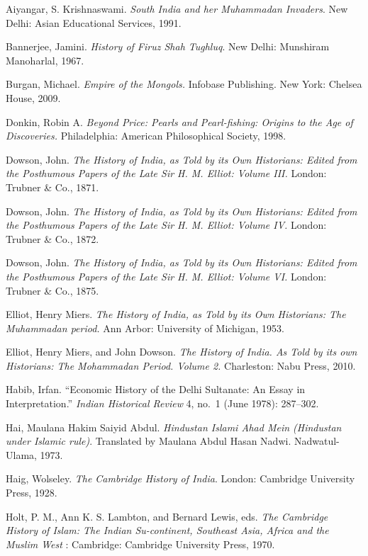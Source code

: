 \begin{thebibliography}{99}
 Aiyangar, S. Krishnaswami.  \textit{South India and her Muhammadan Invaders}. New Delhi: Asian Educational Services, 1991. 

 Bannerjee, Jamini. \textit{History of Firuz Shah Tughluq}. New Delhi: Munshiram Manoharlal, 1967. 

 Burgan, Michael. \textit{ Empire of the Mongols.} Infobase Publishing. New York: Chelsea House, 2009. 

 Donkin, Robin A. \textit{Beyond Price: Pearls and Pearl-fishing: Origins to the Age of Discoveries.} Philadelphia: American Philosophical Society, 1998.

 Dowson, John. \textit{The History of India, as Told by its Own Historians: Edited from the Posthumous Papers of the Late Sir H. M. Elliot: Volume III.} London: Trubner \& Co., 1871.

 Dowson, John. \textit{The History of India, as Told by its Own Historians: Edited from the Posthumous Papers of the Late Sir H. M. Elliot: Volume IV.} London: Trubner \& Co., 1872.

 Dowson, John. \textit{The History of India, as Told by its Own Historians: Edited from the Posthumous Papers of the Late Sir H. M. Elliot: Volume VI.} London: Trubner \& Co., 1875.

 Elliot, Henry Miers. \textit{The History of India, as Told by its Own Historians: The Muhammadan period.} Ann Arbor: University of Michigan, 1953.

 Elliot, Henry Miers, and John Dowson. \textit{The History of India. As Told by its own Historians: The Mohammadan Period. Volume 2.} Charleston: Nabu Press, 2010.

 Habib, Irfan. “Economic History of the Delhi Sultanate: An Essay in Interpretation.” \textit{Indian Historical Review} 4, no.\ 1 (June 1978): 287--302.

 Hai, Maulana Hakim Saiyid Abdul. \textit{Hindustan Islami Ahad Mein (Hindustan under Islamic rule)}. Translated by Maulana Abdul Hasan Nadwi. Nadwatul-Ulama, 1973.

 Haig, Wolseley. \textit{The Cambridge History of India}. London: Cambridge University Press, 1928. 

 Holt, P. M., Ann K. S. Lambton, and Bernard Lewis, eds. \textit{The Cambridge History of Islam: The Indian Su-continent, Southeast Asia, Africa and the Muslim West} : Cambridge: Cambridge University Press, 1970. 


\end{thebibliography}
